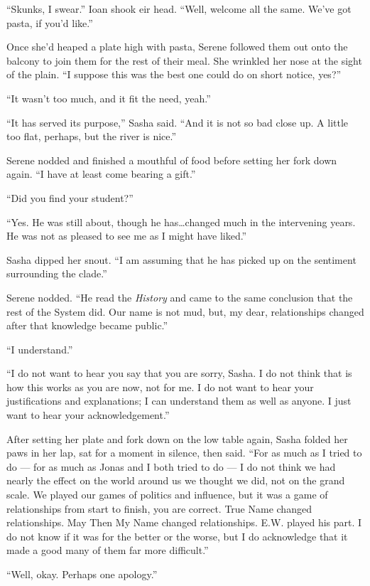 ``Skunks, I swear.'' Ioan shook eir head. ``Well, welcome all the same. We've got pasta, if you'd like.''

Once she'd heaped a plate high with pasta, Serene followed them out onto the balcony to join them for the rest of their meal. She wrinkled her nose at the sight of the plain. ``I suppose this was the best one could do on short notice, yes?''

``It wasn't too much, and it fit the need, yeah.''

``It has served its purpose,'' Sasha said. ``And it is not so bad close up. A little too flat, perhaps, but the river is nice.''

Serene nodded and finished a mouthful of food before setting her fork down again. ``I have at least come bearing a gift.''

``Did you find your student?''

``Yes. He was still about, though he has\ldots changed much in the intervening years. He was not as pleased to see me as I might have liked.''

Sasha dipped her snout. ``I am assuming that he has picked up on the sentiment surrounding the clade.''

Serene nodded. ``He read the \emph{History} and came to the same conclusion that the rest of the System did. Our name is not mud, but, my dear, relationships changed after that knowledge became public.''

``I understand.''

``I do not want to hear you say that you are sorry, Sasha. I do not think that is how this works as you are now, not for me. I do not want to hear your justifications and explanations; I can understand them as well as anyone. I just want to hear your acknowledgement.''

After setting her plate and fork down on the low table again, Sasha folded her paws in her lap, sat for a moment in silence, then said. ``For as much as I tried to do — for as much as Jonas and I both tried to do — I do not think we had nearly the effect on the world around us we thought we did, not on the grand scale. We played our games of politics and influence, but it was a game of relationships from start to finish, you are correct. True Name changed relationships. May Then My Name changed relationships. E.W. played his part. I do not know if it was for the better or the worse, but I do acknowledge that it made a good many of them far more difficult.''

``Well, okay. Perhaps one apology.''

